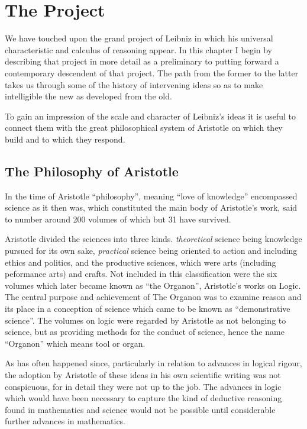 
\chapter{The Project}\label{TheProject}

We have touched upon the grand project of Leibniz in which his universal characteristic
and calculus of reasoning appear.
In this chapter I begin by describing that project in more detail as a preliminary
to putting forward a contemporary descendent of that project.
The path from the former to the latter takes us through some of the history of
intervening ideas so as to make intelligible the new as developed from the old.

To gain an impression of the scale and character of Leibniz's ideas it is useful to connect them with
the great philosophical system of Aristotle on which they build and to which they respond.

\section{The Philosophy of Aristotle}

In the time of Aristotle ``philosophy'', meaning ``love of knowledge'' encompassed science as it then was, which constituted the main body of Aristotle's work, said to number around 200 volumes of which but 31 have survived.

Aristotle divided the sciences into three kinds.
\emph{theoretical} science being knowledge pursued for 
its own sake, \emph{practical} science being oriented to action and including ethics and politics, and
the productive sciences, which were arts (including peformance arts) and crafts.
Not included in this classification were the six volumes which later became known as ``the Organon'', Aristotle's
works on Logic.
The central purpose and achievement of The Organon was to examine reason and its place in a conception of science which came to be known as ``demonstrative science''.
The volumes on logic were regarded by Aristotle as not belonging to science, but as providing methods for the conduct of science, hence the name ``Organon'' which means tool or organ.

As has often happened since, particularly in relation to advances in logical rigour, the adoption by Aristotle of these ideas in his own scientific writing was not conspicuous, for in detail they were not up to the job.
The advances in logic which would have been necessary to capture the kind of deductive reasoning found in mathematics and science would not be possible until considerable further advances in mathematics.

